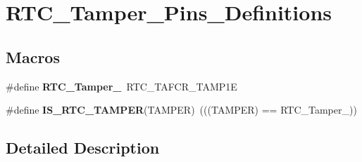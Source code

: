 \hypertarget{group___r_t_c___tamper___pins___definitions}{\section{R\-T\-C\-\_\-\-Tamper\-\_\-\-Pins\-\_\-\-Definitions}
\label{group___r_t_c___tamper___pins___definitions}
}
\subsection*{Macros}
\begin{DoxyCompactItemize}
\item 
\hypertarget{group___r_t_c___tamper___pins___definitions_ga536970a32944a7a76f976ffb5b9c6a1f}{\#define {\bfseries R\-T\-C\-\_\-\-Tamper\-\_}~R\-T\-C\-\_\-\-T\-A\-F\-C\-R\-\_\-\-T\-A\-M\-P1\-E}\label{group___r_t_c___tamper___pins___definitions_ga536970a32944a7a76f976ffb5b9c6a1f}

\item 
\hypertarget{group___r_t_c___tamper___pins___definitions_ga8cb706b03efeeb8534eca0a20450d377}{\#define {\bfseries I\-S\-\_\-\-R\-T\-C\-\_\-\-T\-A\-M\-P\-E\-R}(T\-A\-M\-P\-E\-R)~(((T\-A\-M\-P\-E\-R) == R\-T\-C\-\_\-\-Tamper\-\_))}\label{group___r_t_c___tamper___pins___definitions_ga8cb706b03efeeb8534eca0a20450d377}

\end{DoxyCompactItemize}


\subsection{Detailed Description}
